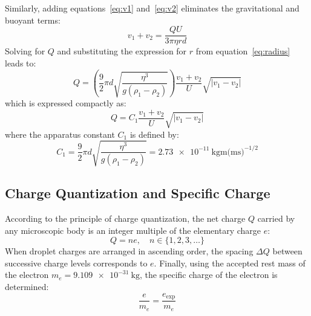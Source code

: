 \documentclass[journal]{IEEEtran}
\begin{document}
Similarly, adding equations~\eqref{eq:v1} and~\eqref{eq:v2} eliminates the gravitational and buoyant terms:
\begin{equation}
    v_1 + v_2 = \frac{Q U}{3\pi \eta r d}
\end{equation}
Solving for $Q$ and substituting the expression for $r$ from equation~\eqref{eq:radius} leads to:
\begin{equation}
    Q = \left( \frac{9}{2}\pi d \sqrt{\frac{\eta^3}{g(\rho_1 - \rho_2)}} \right) \frac{v_1 + v_2}{U} \sqrt{|v_1 - v_2|}
\end{equation}
which is expressed compactly as:
\begin{equation}
    Q = C_1 \frac{v_1 + v_2}{U} \sqrt{|v_1 - v_2|}
    \label{eq:charge}
\end{equation}
where the apparatus constant $C_1$ is defined by:
\begin{equation}
    C_1 = \frac{9}{2}\pi d \sqrt{\frac{\eta^3}{g(\rho_1 - \rho_2)}} = \SI{2.73e-11}{\kilogram\meter(\meter\second)^{-1/2}}
    \label{eq:C1}
\end{equation}

\subsection{Charge Quantization and Specific Charge}
According to the principle of charge quantization, the net charge $Q$ carried by any microscopic body is an integer multiple of the elementary charge $e$:
\begin{equation}
    Q = n e, \quad n \in \{1, 2, 3, \dots\}
    \label{eq:quantization}
\end{equation}
When droplet charges are arranged in ascending order, the spacing $\Delta Q$ between successive charge levels corresponds to $e$. Finally, using the accepted rest mass of the electron $m_e = \SI{9.109e-31}{\kilogram}$, the specific charge of the electron is determined:
\begin{equation}
    \frac{e}{m_e} = \frac{e_{\text{exp}}}{m_e}
    \label{eq:specific_charge}
\end{equation}

\end{document}
